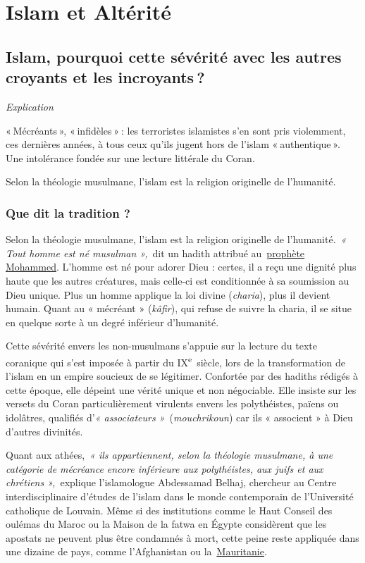 \chapter{Islam et Altérité}




\section{Islam, pourquoi cette sévérité avec les autres croyants et les
incroyants ?}

\emph{Explication~}

« Mécréants », « infidèles » : les terroristes islamistes s'en sont pris
violemment, ces dernières années, à tous ceux qu'ils jugent hors de
l'islam « authentique ». Une intolérance fondée sur une lecture
littérale du Coran. 

Selon la théologie musulmane, l'islam est la religion originelle de
l'humanité.

\subsection{Que dit la tradition ?}

Selon la théologie musulmane, l'islam est la religion originelle de
l'humanité.~\emph{« Tout homme est né musulman »,}~dit un hadith
attribué
au~\href{https://www.la-croix.com/sacralite-prophete-lislam-2020-11-06-1101123195}{\underline{prophète
Mohammed}}. L'homme est né pour adorer Dieu : certes, il a reçu une
dignité plus haute que les autres créatures, mais celle-ci est
conditionnée à sa soumission au Dieu unique. Plus un homme applique la
loi divine (\emph{charia}), plus il devient humain. Quant au « mécréant
» (\emph{kâfir}), qui refuse de suivre la charia, il se situe en quelque
sorte à un degré inférieur d'humanité.

Cette sévérité envers les non-musulmans s'appuie sur la lecture du texte
coranique qui s'est imposée à partir du IX\textsuperscript{e}~siècle,
lors de la transformation de l'islam en un empire soucieux de se
légitimer. Confortée par des hadiths rédigés à cette époque, elle
dépeint une vérité unique et non négociable. Elle insiste sur les
versets du Coran particulièrement virulents envers les polythéistes,
païens ou idolâtres, qualifiés d'\emph{« associateurs
»}~(\emph{mouchrikoun}) car ils « associent » à Dieu d'autres divinités.

Quant aux athées,~\emph{« ils appartiennent, selon la théologie
musulmane, à une catégorie de mécréance encore inférieure aux
polythéistes, aux juifs et aux chrétiens »,~}explique l'islamologue
Abdessamad Belhaj, chercheur au Centre interdisciplinaire d'études de
l'islam dans le monde contemporain de l'Université catholique de
Louvain. Même si des institutions comme le Haut Conseil des oulémas du
Maroc ou la Maison de la fatwa en Égypte considèrent que les apostats ne
peuvent plus être condamnés à mort, cette peine reste appliquée dans une
dizaine de pays, comme l'Afghanistan ou
la~\href{https://www.la-croix.com/Monde/Afrique/prisons-Mauritanie-calvaire-dun-apostat-2019-09-30-1201051050}{\underline{Mauritanie}}.

